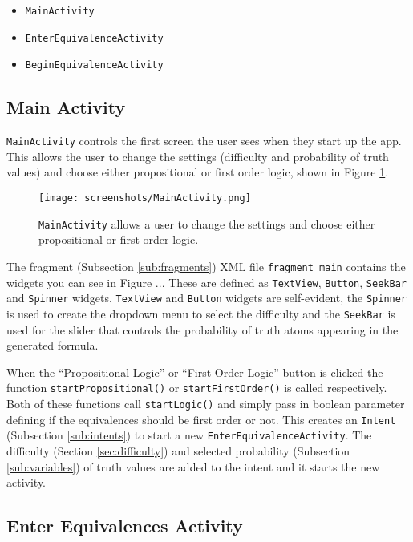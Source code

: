 \documentclass{report}
\begin{document}
\begin{itemize}
\item {\tt MainActivity}
\item {\tt EnterEquivalenceActivity}
\item {\tt BeginEquivalenceActivity}
\end{itemize}

\subsection{Main Activity}

{\tt MainActivity} controls the first screen the user sees when they start up the app. This allows the user to change the settings (difficulty and probability of truth values) and choose either propositional or first order logic, shown in Figure \ref{mainactivity}.

\begin{figure}[ht!]
    \centering
    \texttt{[image: screenshots/MainActivity.png]}
    \caption{{\tt MainActivity} allows a user to change the settings and choose either propositional or first order logic.}
    \label{mainactivity}
\end{figure}

The fragment (Subsection \ref{sub:fragments}) XML file {\tt fragment\_main} contains the widgets you can see in Figure ... These are defined as {\tt TextView}, {\tt Button}, {\tt SeekBar} and {\tt Spinner} widgets. {\tt TextView} and {\tt Button} widgets are self-evident, the {\tt Spinner} is used to create the dropdown menu to select the difficulty and the {\tt SeekBar} is used for the slider that controls the probability of truth atoms appearing in the generated formula.

When the ``Propositional Logic'' or ``First Order Logic'' button is clicked the function {\tt startPropositional()} or {\tt startFirstOrder()} is called respectively. Both of these functions call {\tt startLogic()} and simply pass in boolean parameter defining if the equivalences should be first order or not. This creates an {\tt Intent} (Subsection \ref{sub:intents}) to start a new {\tt EnterEquivalenceActivity}. The difficulty (Section \ref{sec:difficulty}) and selected probability (Subsection \ref{sub:variables}) of truth values are added to the intent and it starts the new activity.

\subsection{Enter Equivalences Activity}
\end{document}
